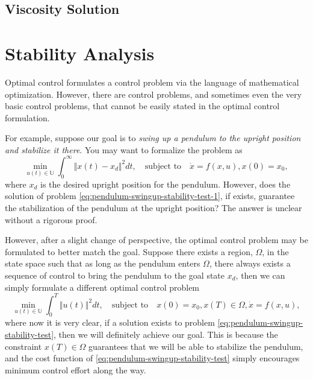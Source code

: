 \documentclass[
]{book}
\theoremstyle{definition}
\theoremstyle{definition}
\theoremstyle{definition}
\theoremstyle{definition}
\theoremstyle{remark}
\begin{document}
\hypertarget{viscosity-solution}{%
\section{Viscosity Solution}\label{viscosity-solution}}

\hypertarget{stability}{%
\chapter{Stability Analysis}\label{stability}}

Optimal control formulates a control problem via the language of mathematical optimization. However, there are control problems, and sometimes even the very basic control problems, that cannot be easily stated in the optimal control formulation.

For example, suppose our goal is to \emph{swing up a pendulum to the upright position and stabilize it there}. You may want to formalize the problem as
\begin{equation}
\min_{u(t) \in \mathbb{U}} \int_{0}^{\infty} \Vert x(t) - x_d \Vert^2 dt, \quad \text{subject to} \quad \dot{x} = f(x,u), x(0) = x_0,
\label{eq:pendulum-swingup-stability-test-1}
\end{equation}
where \(x_d\) is the desired upright position for the pendulum. However, does the solution of problem \eqref{eq:pendulum-swingup-stability-test-1}, if exists, guarantee the stabilization of the pendulum at the upright position? The answer is unclear without a rigorous proof.

However, after a slight change of perspective, the optimal control problem may be formulated to better match the goal. Suppose there exists a region, \(\Omega\), in the state space such that as long as the pendulum enters \(\Omega\), there always exists a sequence of control to bring the pendulum to the goal state \(x_d\), then we can simply formulate a different optimal control problem
\begin{equation}
\min_{u(t) \in \mathbb{U}} \int_{0}^{T} \Vert u(t) \Vert^2 dt, \quad \text{subject to} \quad x(0)=x_0, x(T) \in \Omega, \dot{x} = f(x,u),
\label{eq:pendulum-swingup-stability-test}
\end{equation}
where now it is very clear, if a solution exists to problem \eqref{eq:pendulum-swingup-stability-test}, then we will definitely achieve our goal. This is because the constraint \(x(T) \in \Omega\) guarantees that we will be able to stabilize the pendulum, and the cost function of \eqref{eq:pendulum-swingup-stability-test} simply encourages minimum control effort along the way.
\end{document}
